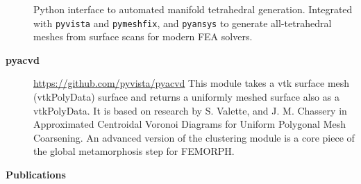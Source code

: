 \documentclass[letterpaper,11pt]{article}
\newcommand{\resheading}[1]{{\large \colorbox{mygrey}{\begin{minipage}{\textwidth}{\textbf{#1 \vphantom{p\^{E}}}}\end{minipage}}}}
\begin{document}
\begin{description}
Python interface to automated manifold tetrahedral generation. Integrated with \texttt{pyvista} and \texttt{pymeshfix}, and \texttt{pyansys} to generate all-tetrahedral meshes from surface scans for modern FEA solvers.
\item[\textbf{pyacvd}] \url{https://github.com/pyvista/pyacvd} \newline
  This module takes a vtk surface mesh (vtkPolyData) surface and returns a uniformly meshed surface also as a vtkPolyData. It is based on research by S. Valette, and J. M. Chassery in Approximated Centroidal Voronoi Diagrams for Uniform Polygonal Mesh Coarsening. An advanced version of the clustering module is a core piece of the global metamorphosis step for FEMORPH.
\end{description}


\newpage
\resheading{Publications}
\end{document}
